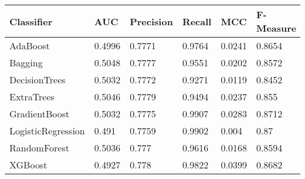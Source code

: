 \begin{tabular}{|p{3cm}p{1.2cm}p{1.2cm}p{1.2cm}p{1.2cm}p{1.5cm}|}
  \hline
Classifier & AUC & Precision & Recall & MCC & F-Measure \\ 
  \hline \hline
AdaBoost & 0.4996 & 0.7771 & 0.9764 & 0.0241 & 0.8654 \\ 
  Bagging & 0.5048 & 0.7777 & 0.9551 & 0.0202 & 0.8572 \\ 
  DecisionTrees & 0.5032 & 0.7772 & 0.9271 & 0.0119 & 0.8452 \\ 
  ExtraTrees & 0.5046 & 0.7779 & 0.9494 & 0.0237 & 0.855 \\ 
  GradientBoost & 0.5032 & 0.7775 & 0.9907 & 0.0283 & 0.8712 \\ 
  LogisticRegression & 0.491 & 0.7759 & 0.9902 & 0.004 & 0.87 \\ 
  RandomForest & 0.5036 & 0.777 & 0.9616 & 0.0168 & 0.8594 \\ 
  XGBoost & 0.4927 & 0.778 & 0.9822 & 0.0399 & 0.8682 \\ 
   \hline
\end{tabular}
